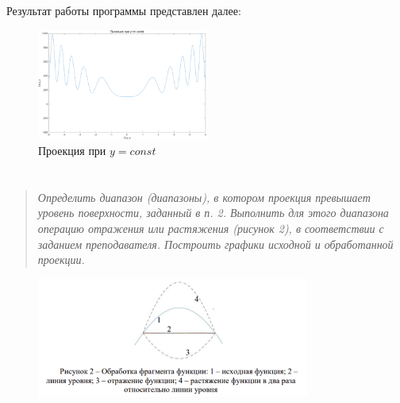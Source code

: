 
Результат работы программы представлен далее:
\begin{figure}[H]
    \centering
    \includegraphics[width=0.5\textwidth]{figs/ex5.png}
    \caption{Проекция при $y=const$}
    \label{fig:Проекция при $y=const$}
\end{figure}

\section*{  }
\begin{quote}
    \textit{Определить диапазон (диапазоны), в котором проекция превышает уровень поверхности, заданный в п. 2. Выполнить для этого диапазона операцию отражения или растяжения (рисунок 2), в соответствии с заданием преподавателя. Построить графики исходной и обработанной проекции. }
\end{quote}

\begin{figure}[H]
    \centering
    \includegraphics[width=0.8\textwidth]{figs/ex6.png}
    \label{fig:условия задания}
\end{figure}




